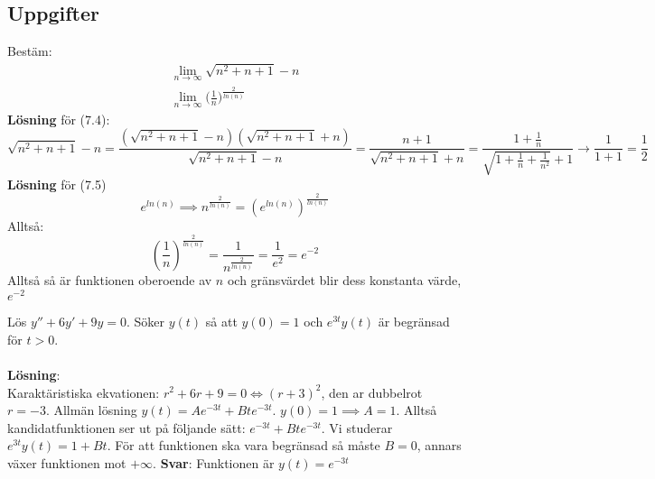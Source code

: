 \documentclass{report}
\begin{document}
\subsection{Uppgifter}
\ex{}
{
Bestäm:
\begin{align}
	\lim_{n \to \infty} \sqrt{n^2+n+1} - n\\
	\lim_{n \to \infty} \bigl( \frac{1}{n} \bigr ) ^{ \frac{2}{ln(n)}  }
\end{align}
\textbf{Lösning} för (7.4):
\begin{equation*}
	\sqrt{n^2+n+1} -n = \frac{( \sqrt{n^2+n+1} - n)( \sqrt{n^2+n+1} +n ) }{ \sqrt{n^2+n+1} -n } = \frac{n+1}{ \sqrt{n^2+n+1} +n  } = \frac{1 + \frac{1}{n} }{ \sqrt{1 + \frac{1}{n} + \frac{1}{n^2} } + 1 } \to \frac{1}{1+1} = \frac{1}{2}    
\end{equation*}
\textbf{Lösning} för (7.5)
\begin{equation*}
	e^{ln(n)} \implies n ^{ \frac{2}{ln(n)}  } = (e^{ln(n)})^{ \frac{2}{ln(n)}  }
\end{equation*}
Alltså:
\begin{equation*}
	( \frac{1}{n}  )^{ \frac{2}{ln(n)}  } = \frac{1}{n^{ \frac{2}{ln(n)}  }} = \frac{1}{e^2} = e^{-2}
\end{equation*}
Alltså så är funktionen oberoende av $ n $ och gränsvärdet blir dess konstanta värde, $ e^{-2} $ 
}

\ex{}
{
	Lös $ y''+6y'+9y = 0 $. Söker $ y(t) $ så att $ y(0) = 1 $ och $ e^{3t}y(t) $ är begränsad för $ t > 0 $.\\\\
\textbf{Lösning}:\\
Karaktäristiska ekvationen: $ r^2+6r+9 = 0 \iff (r+3)^2 $, den ar dubbelrot $ r = -3 $. Allmän lösning $ y(t) = Ae^{-3t} +Bte^{-3t}$. $ y(0) = 1 \implies A = 1 $. Alltså kandidatfunktionen ser ut på följande sätt: $ e^{-3t}+Bte^{-3t} $. Vi studerar $ e^{3t}y(t) = 1 + Bt $. För att funktionen ska vara begränsad så måste $ B = 0 $, annars växer funktionen mot $ + \infty $. \textbf{Svar}: Funktionen är $ y(t) = e^{-3t} $ 
}
\end{document}
